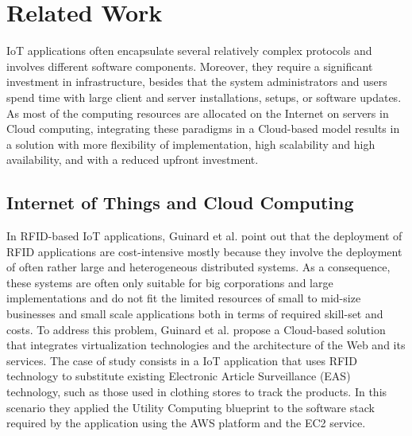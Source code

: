 \section{Related Work}
\label{sec:related_work}
IoT applications often encapsulate several relatively complex protocols and involves
different software components. Moreover, they require a significant investment in infrastructure,
besides that the system administrators and users spend time with large client and server
installations, setups, or software updates. As most of the computing resources are allocated
on the Internet on servers in Cloud computing, integrating these paradigms in a Cloud-based model
results in a solution with more flexibility of implementation, high scalability and high availability,
and with a reduced upfront investment.\\
\subsection{Internet of Things and Cloud Computing}
\label{sub:Cloud Computing and Internet of Things}
In RFID-based IoT applications, Guinard et al. \cite{guinard2011cloud} point out that the
deployment of RFID applications are cost-intensive mostly because they involve the
deployment of often rather large and heterogeneous distributed systems. As a consequence,
these systems are often only suitable for big corporations and large implementations and
do not fit the limited resources of small to mid-size businesses and small scale applications
both in terms of required skill-set and costs. To address this problem, Guinard et al. propose
a Cloud-based solution that integrates virtualization technologies and the architecture of
the Web and its services. The case of study consists in a IoT application that uses RFID technology
to substitute existing Electronic Article Surveillance (EAS) technology, such as those used in
clothing stores to track the products. In this scenario they applied the Utility Computing blueprint
to the software stack required by the application using the AWS platform and the EC2 service.\\


